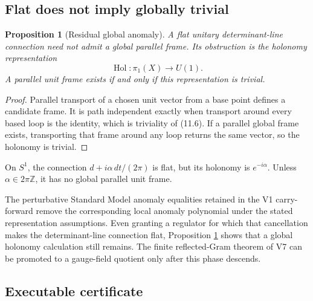 \documentclass[11pt]{article}
\newtheorem{proposition}[theorem]{Proposition}
\theoremstyle{remark}
\begin{document}
\subsection{Flat does not imply globally trivial}

\begin{proposition}[Residual global anomaly]
\label{prop:v19v8-flat}
A flat unitary determinant-line connection need not admit a global
parallel frame.  Its obstruction is the holonomy representation
\[
 \operatorname{Hol}:\pi_1(X)\longrightarrow U(1).              \tag{11.6}
\]
A parallel unit frame exists if and only if this representation is
trivial.
\end{proposition}

\begin{proof}
Parallel transport of a chosen unit vector from a base point defines a
candidate frame.  It is path independent exactly when transport around
every based loop is the identity, which is triviality of (11.6).  If a
parallel global frame exists, transporting that frame around any loop
returns the same vector, so the holonomy is trivial.
\end{proof}

\begin{example}
\label{ex:v19v8-circle}
On \(S^1\), the connection \(d+i\alpha\,dt/(2\pi)\) is flat, but its
holonomy is \(e^{-i\alpha}\).  Unless \(\alpha\in2\pi\mathbb Z\), it has no
global parallel unit frame.
\end{example}

The perturbative Standard Model anomaly equalities retained in the V1
carry-forward remove the corresponding local anomaly polynomial under the
stated representation assumptions.  Even granting a regulator for which
that cancellation makes the determinant-line connection flat, Proposition
\ref{prop:v19v8-flat} shows that a global holonomy calculation still
remains.  The finite reflected-Gram theorem of V7 can be promoted to a
gauge-field quotient only after this phase descends.

\subsection{Executable certificate}
\end{document}
